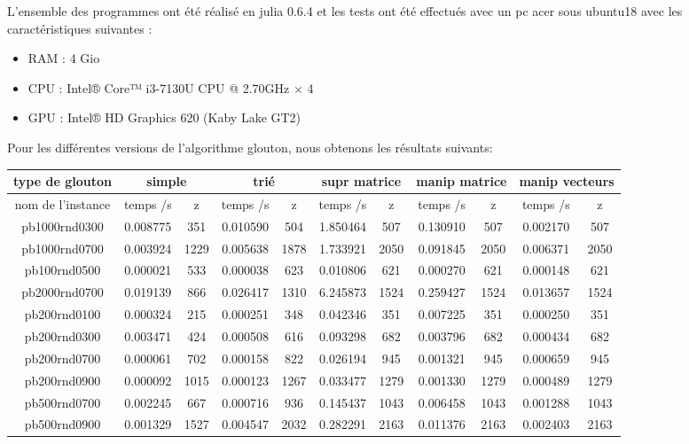 \noindent
L'ensemble des programmes ont été réalisé en julia 0.6.4 et les tests ont été effectués avec un pc acer sous ubuntu18 avec les caractéristiques suivantes : 
\begin{itemize}
\item RAM : 4 Gio
\item CPU : Intel® Core™ i3-7130U CPU @ 2.70GHz × 4 
\item GPU : Intel® HD Graphics 620 (Kaby Lake GT2)
\end{itemize}
\noindent
Pour les différentes versions de l'algorithme glouton, nous obtenons les résultats suivants:
\begin{center}
    \begin{tabular}{|c|c|c|c|c|c|c|c|c|c|c|}
    \hline
    type de glouton & \multicolumn{2}{c|}{simple} &
    \multicolumn{2}{c|}{trié} &
    \multicolumn{2}{c|}{supr matrice} &
    \multicolumn{2}{c|}{manip matrice} &
    \multicolumn{2}{c|}{manip vecteurs}\\
    
    \hline
    nom de l'instance  & temps /s  & z & temps /s & z & temps /s & z & temps /s & z & temps /s & z\\
     \hline
     pb1000rnd0300 & 0.008775 & 351 & 0.010590 & 504 & 1.850464 & 507 & 0.130910 & 507 & 0.002170 & 507\\
     \hline
     pb1000rnd0700 & 0.003924 & 1229 & 0.005638 & 1878 & 1.733921 & 2050 & 0.091845 & 2050 & 0.006371 & 2050\\
     \hline
     pb100rnd0500 & 0.000021 & 533 & 0.000038 & 623 & 0.010806 & 621 & 0.000270 & 621 & 0.000148 & 621\\
     \hline
     pb2000rnd0700 & 0.019139 & 866 & 0.026417 & 1310 & 6.245873 & 1524 & 0.259427 & 1524 & 0.013657 & 1524\\
     \hline
     pb200rnd0100 & 0.000324 & 215 & 0.000251 & 348 & 0.042346 & 351 & 0.007225 & 351 & 0.000250 & 351\\
     \hline
     pb200rnd0300 & 0.003471 & 424 & 0.000508 & 616 & 0.093298 & 682 & 0.003796 & 682 & 0.000434 & 682\\
     \hline
     pb200rnd0700 & 0.000061 & 702 & 0.000158 & 822 & 0.026194 & 945 & 0.001321 & 945 & 0.000659 & 945\\
     \hline
     pb200rnd0900 & 0.000092 & 1015 & 0.000123 & 1267 & 0.033477 & 1279 & 0.001330 & 1279 & 0.000489 & 1279\\
     \hline 
     pb500rnd0700 & 0.002245 & 667 & 0.000716 & 936 & 0.145437 & 1043 & 0.006458 & 1043 & 0.001288 & 1043\\
     \hline 
     pb500rnd0900 & 0.001329 & 1527 & 0.004547 & 2032 & 0.282291 & 2163 & 0.011376 & 2163 & 0.002403 & 2163\\
     \hline
    \end{tabular}
\end{center}

